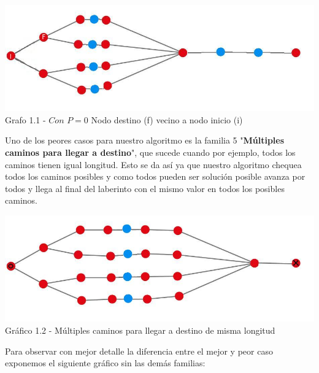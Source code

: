 \vspace*{0.3cm} \vspace*{0.3cm}
  \begin{center}
\includegraphics[scale=0.7]{./EJ1/ej1grafomejorcaso2.jpeg}
{Grafo 1.1 - $Con$ $P=0$ Nodo destino (f) vecino a nodo inicio (i)}
  \end{center}
  \vspace*{0.3cm}

Uno de los peores casos para nuestro algoritmo es la familia 5 "\textbf{Múltiples caminos para llegar a destino}", que sucede cuando por ejemplo, todos los caminos tienen igual longitud. Esto se da as\'i ya que nuestro algoritmo chequea todos los caminos posibles y como todos pueden ser soluci\'on posible avanza por todos y llega al final del laberinto con el mismo valor en todos los posibles caminos.\\

\vspace*{0.3cm} \vspace*{0.3cm}
  \begin{center}
\includegraphics[scale=0.7]{./EJ1/ej1grafopeorcaso.jpeg}
{Gr\'afico 1.2 - Múltiples caminos para llegar a destino de misma longitud}
  \end{center}
  \vspace*{0.3cm}

Para observar con mejor detalle la diferencia entre el mejor y peor caso exponemos el siguiente gráfico sin las demás familias:

